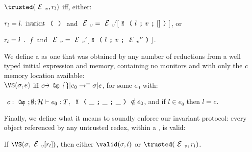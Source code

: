 \indent $\trusted(\EV,r_l)$ iff, either:
\begin{iitemize}
\item $r_l=l.\invariant$ and
$\EV=\EV'[\M{l}{v}{\square}]$, or
\item $r_l=l{ \mbox{ {\texttt{.}} } } f$ and
$\EV=\EV'[\M{l}{v}{\EV''}]$.
\end{iitemize}

\noindent We define a \VS as one that was obtained by any number of reductions from a well typed initial expression and memory, containing no monitors and with only the $c$ memory location available:\\
\indent $\VS(\s, e)$ iff $c\mapsto\Kw{Cap}\{\}|e_0\rightarrow^+ \s|e$, for some $e_0$ with:
\begin{iitemize}%
\item[] ${}_{}$\quad${}_{}$ $c:\Kw{Cap};\emptyset; \h \vdash e_0: 	T$, $\M{\_}{\_}{\_} \notin e_0$, and if $l \in e_0$ then $l = c$.
\end{iitemize}

\noindent Finally, we define what it means to soundly enforce our invariant protocol: every object referenced by any untrusted redex, within a \VS, is valid:%
\SS\begin{theorem}[Soundness]\rm
If $\VS(\s, \EV[r_l])$, then either $\valid(\s,l)$ or $\trusted(\EV,r_l)$.
\end{theorem}
